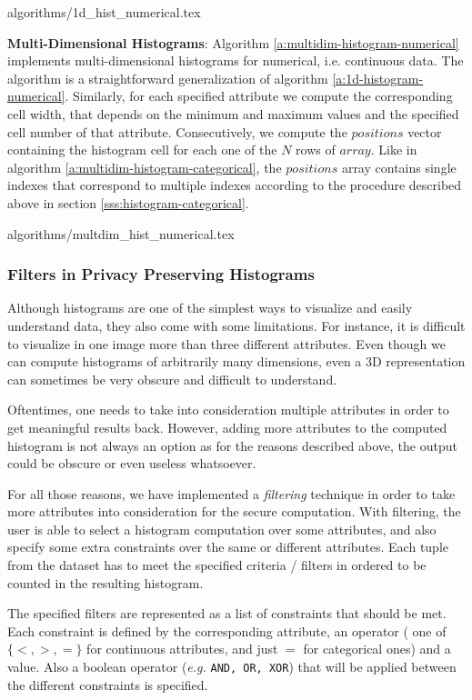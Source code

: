{algorithms/1d_hist_numerical.tex}



\textbf{Multi-Dimensional Histograms}:
Algorithm \ref{a:multidim-histogram-numerical} implements multi\hyp dimensional histograms for numerical, i.e. continuous data.
The algorithm is a straightforward generalization of algorithm \ref{a:1d-histogram-numerical}.
Similarly, for each specified attribute we compute the corresponding cell width, that depends on the minimum and maximum values and the specified cell number of that attribute.
Consecutively, we compute the $positions$ vector containing the histogram cell for each one of the $N$ rows of $array$.
Like in algorithm \ref{a:multidim-histogram-categorical}, the $positions$ array contains single indexes that correspond to multiple indexes according to the procedure described above in section \ref{sss:histogram-categorical}.


{algorithms/multdim_hist_numerical.tex}



\subsubsection{Filters in Privacy Preserving Histograms}\label{sss:histogram-filters}
Although histograms are one of the simplest ways to visualize and easily understand data, they also come with some limitations.
For instance, it is difficult to visualize in one image more than three different attributes.
Even though we can compute histograms of arbitrarily many dimensions, even a 3D representation can sometimes  be very obscure and difficult to understand.

Oftentimes, one needs to take into consideration multiple attributes in order to get meaningful results back.
However, adding more attributes to the computed histogram is not always an option as for the reasons described above, the output could be obscure or even useless whatsoever.

For all those reasons, we have implemented a \textit{filtering} technique in order to take more attributes into consideration for the secure computation.
With filtering, the user is able to select a histogram computation over some attributes, and also specify some extra constraints over the same or different attributes.
Each tuple from the dataset has to meet the specified criteria / filters in ordered to be counted in the resulting histogram.

The specified filters are represented as a list of constraints that should be met.
Each constraint is defined by the corresponding attribute, an operator ( one of $\{<, >, =\}$ for continuous attributes, and just $=$ for categorical ones) and a value.
Also a boolean operator (\textit{e.g.} \texttt{AND, OR, XOR}) that will be applied between the different constraints is specified.


